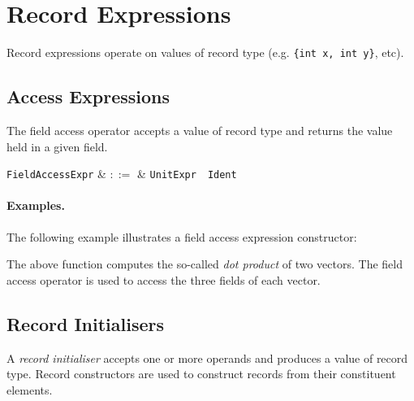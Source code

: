
\section{Record Expressions}
\label{c_expr_record}

Record expressions operate on values of record type (e.g. \lstinline|{int x, int y}|, etc).


\subsection{Access Expressions}
\label{c_expr_field_access}

The field access operator accepts a value of record type and returns the value held in a given field.

\begin{syntax}
  \verb+FieldAccessExpr+ & $::=$ & \verb+UnitExpr+\ \ \verb+Ident+\\
\end{syntax}

\paragraph{Examples.}  The following example illustrates a field access expression constructor:



The above function computes the so-called {\em dot product} of two vectors.  The field access operator is used to access the three fields of each vector. 


\subsection{Record Initialisers}
\label{c_expr_record_constructor}
A {\em record initialiser} accepts one or more operands and produces a value of record type.  Record constructors are used to construct records from their constituent elements.  


